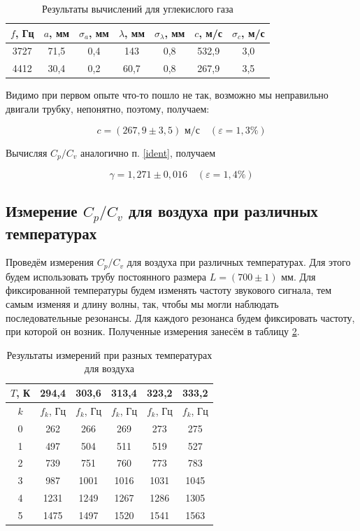 \documentclass[a4paper,12pt]{article}
\theoremstyle{definition}
\begin{document}
	\begin{table}[H]
		\centering
		\begin{tabular}{|c|c|c|c|c|c|c|}
			\hline
			$ f $, Гц & $ a $, мм & $ \sigma_a $, мм & $ \lambda $, мм & $ \sigma_\lambda $, мм & $ c $, м/с & $ \sigma_c $, м/с \\ \hline
			3727 & 71,5 & 0,4 & 143 & 0,8 & 532,9 & 3,0 \\ \hline
			4412 & 30,4 & 0,2 & 60,7 & 0,8 & 267,9 & 3,5 \\ \hline
		\end{tabular}
		\caption{Результаты вычислений для углекислого газа}
		\label{tab:resCO2}
	\end{table}

	
	Видимо при первом опыте что-то пошло не так, возможно мы неправильно двигали трубку, непонятно, поэтому, получаем:
	
	\[ \boxed{c=(267,9 \pm 3,5)  \text{ м/с}} \quad (\varepsilon=1,3\%)\]
	
	Вычисляя $ C_p/C_v $ аналогично п. \ref{ident}, получаем
	
	\[ \boxed{\gamma = 1,271 \pm 0,016}\quad (\varepsilon=1,4\%) \]
	
	\subsection{Измерение $ C_p/C_v $ для воздуха при различных температурах}
	
	Проведём измерения $ C_p/C_v $ для воздуха при различных температурах. Для этого будем использовать трубу постоянного размера $ L = (700 \pm 1) $ мм. Для фиксированной температуры будем изменять частоту звукового сигнала, тем самым изменяя и длину волны, так, чтобы мы могли наблюдать последовательные резонансы. Для каждого резонанса будем фиксировать частоту, при которой он возник. Полученные измерения занесём в таблицу \ref{tab:constL}.
	
	\begin{table}[H]
		\centering
		\begin{tabular}{|c|c|c|c|c|c|}
			\hline
			$ T $, К & \textbf{294,4} & \textbf{303,6} & \textbf{313,4} & \textbf{323,2}& \textbf{333,2}  \\ \hline
			$k$ &  $ f_k $, Гц & $ f_k $, Гц &  $ f_k $, Гц & $ f_k $, Гц & $ f_k $, Гц \\ \hline
			0 & 262 &266 & 269&273&275  \\ \hline
			1 & 497 &504 & 511 &519& 527 \\ \hline
			2 & 739 & 751 & 760&773& 783 \\ \hline
			3 & 987 & 1001 & 1016 &1031& 1045 \\ \hline
			4 & 1231 & 1249& 1267 &1286& 1305 \\ \hline
			5 & 1475 & 1497 & 1520&1541& 1563 \\ \hline
		\end{tabular}
		\caption{Результаты измерений при разных температурах для воздуха}
		\label{tab:constL}
	\end{table}
	
\end{document}

